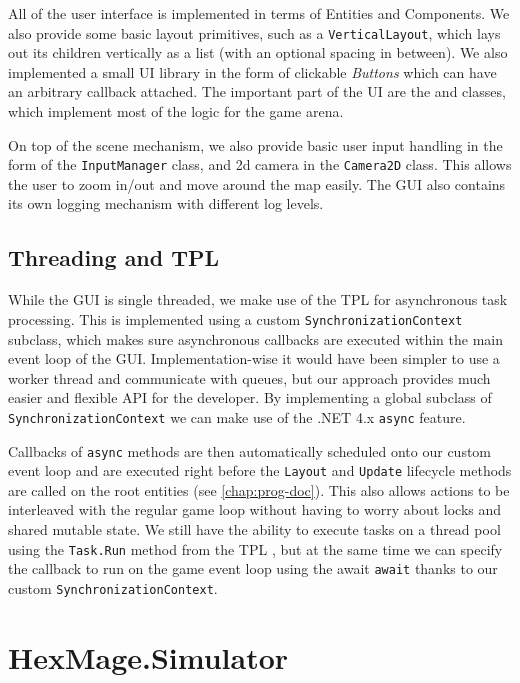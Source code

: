 All of the user interface is implemented in terms of Entities and Components. We also provide some basic layout primitives, such as a \verb|VerticalLayout|, which lays out its children vertically as a list (with an optional spacing in between). We also implemented a small UI library in the form of clickable \emph{Buttons} which can have an arbitrary callback attached. The important part of the UI are the  and  classes, which implement most of the logic for the game arena.

On top of the scene mechanism, we also provide basic user input handling in the form of the \verb|InputManager| class, and 2d camera in the \verb|Camera2D| class. This allows the user to zoom in/out and move around the map easily. The GUI also contains its own logging mechanism with different log levels.

\subsection{Threading and TPL}
\label{threading-tpl}

While the GUI is single threaded, we make use of the TPL for asynchronous task processing. This is implemented using a custom \verb|SynchronizationContext| subclass, which makes sure asynchronous callbacks are executed within the main event loop of the GUI. Implementation-wise it would have been simpler to use a worker thread and communicate with queues, but our approach provides much easier and flexible API for the developer. By implementing a global subclass of \verb|SynchronizationContext| we can make use of the .NET 4.x \verb|async| \citep{async} feature. 

Callbacks of \verb|async| methods are then automatically scheduled onto our custom event loop and are executed right before the \verb|Layout| and \verb|Update| lifecycle methods are called on the root entities (see \autoref{chap:prog-doc}). This also allows actions to be interleaved with the regular game loop without having to worry about locks and shared mutable state. We still have the ability to execute tasks on a thread pool using the \verb|Task.Run| method from the TPL \citep{tpl}, but at the same time we can specify the callback to run on the game event loop using the await \verb|await| thanks to our custom \verb|SynchronizationContext|.

\section{HexMage.Simulator}
\label{sec:simulator}

